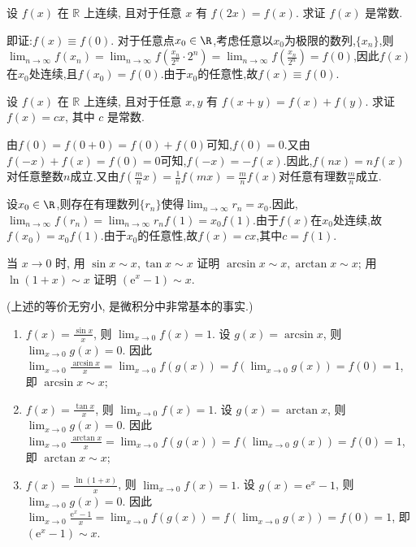 \begin{exercise}[2.1.14]
    设 $f(x)$ 在 $\mathbb{R}$ 上连续, 且对于任意 $x$ 有 $f(2x)=f(x)$. 求证 $f(x)$ 是常数.
\end{exercise}

\begin{solution}
    即证:$f(x) \equiv f(0)$. 对于任意点$x_0 \in \R$,考虑任意以$x_0$为极限的数列,$\{x_n\}$,则$\lim_{n \to \infty} f(x_n) = \lim_{n \to \infty} f \left( \frac{x_n}{2^n} \cdot 2^n \right) = \lim_{n \to \infty} f\left(\frac{x_n}{2^n}\right) = f(0)$,因此$f(x)$在$x_0$处连续,且$f(x_0) = f(0)$.由于$x_0$的任意性,故$f(x) \equiv f(0)$.
\end{solution}

\begin{exercise}[2.1.15]
    设 $f(x)$ 在 $\mathbb{R}$ 上连续, 且对于任意 $x,y$ 有 $f(x+y)=f(x)+f(y)$. 求证 $f(x)=cx$, 其中 $c$ 是常数.
\end{exercise}

\begin{solution}
    由$f(0) = f(0+0) = f(0)+f(0)$可知,$f(0) = 0$.又由$f(-x) + f(x) = f(0) = 0$可知,$f(-x) = -f(x)$.因此,$f(nx) = nf(x)$对任意整数$n$成立.又由$f\left(\frac{m}{n}x\right) = \frac{1}{n}f(mx) = \frac{m}{n}f(x)$对任意有理数$\frac{m}{n}$成立.

    设$x_0 \in \R$,则存在有理数列$\{r_n\}$使得$\lim_{n \to \infty} r_n = x_0$.因此,$\lim_{n \to \infty} f(r_n) = \lim_{n \to \infty} r_n f(1) = x_0 f(1)$.由于$f(x)$在$x_0$处连续,故$f(x_0) = x_0 f(1)$.由于$x_0$的任意性,故$f(x) = cx$,其中$c=f(1)$.
\end{solution}

\begin{exercise}[2.1.16]
    当 $x \to 0$ 时, 用 $\sin x \sim x, \tan x \sim x$ 证明 $\arcsin x \sim x, \arctan x \sim x$; 用 $\ln(1+x) \sim x$ 证明 $(\mathrm{e}^x-1) \sim x$.

    (上述的等价无穷小, 是微积分中非常基本的事实.)
\end{exercise}

\begin{solution}
    \begin{enumerate}
        \item $f(x) = \frac{\sin x}{x}$, 则 $\lim_{x \to 0} f(x) = 1$. 设 $g(x) = \arcsin x$, 则 $\lim_{x \to 0} g(x) = 0$. 因此$\lim_{x \to 0} \frac{\arcsin x}{x} = \lim_{x \to 0} f(g(x)) = f \left( \lim_{x \to 0} g(x) \right) = f(0) = 1$, 即 $\arcsin x \sim x$;
        \item $f(x) = \frac{\tan x}{x}$, 则 $\lim_{x \to 0} f(x) = 1$. 设 $g(x) = \arctan x$, 则 $\lim_{x \to 0} g(x) = 0$. 因此$\lim_{x \to 0} \frac{\arctan x}{x} = \lim_{x \to 0} f(g(x)) = f \left( \lim_{x \to 0} g(x) \right) = f(0) = 1$, 即 $\arctan x \sim x$;
        \item $f(x) = \frac{\ln(1+x)}{x}$, 则 $\lim_{x \to 0} f(x) = 1$. 设 $g(x) = \mathrm{e}^x - 1$, 则 $\lim_{x \to 0} g(x) = 0$. 因此$\lim_{x \to 0} \frac{\mathrm{e}^x - 1}{x} = \lim_{x \to 0} f(g(x)) = f \left( \lim_{x \to 0} g(x) \right) = f(0) = 1$, 即 $(\mathrm{e}^x - 1) \sim x$.
    \end{enumerate}
\end{solution}


